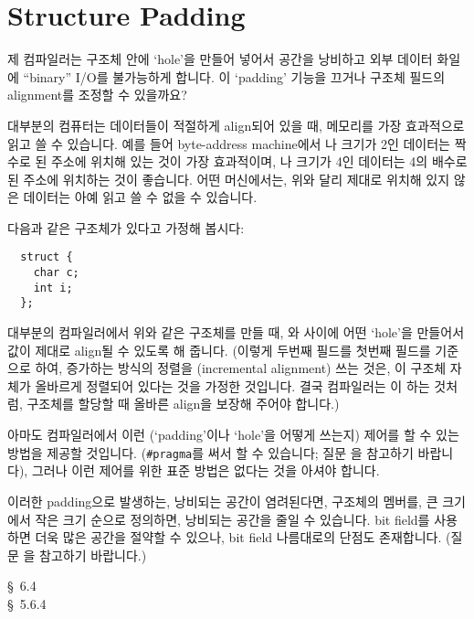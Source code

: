 \section{Structure Padding}

\begin{faq}
	제 컴파일러는 구조체 안에 `hole'을 만들어 넣어서 공간을
	낭비하고 외부 데이터 화일에 ``binary'' I/O를 불가능하게 합니다.
	이 `padding' 기능을 끄거나 구조체 필드의 alignment를 조정할 수
	있을까요?

\A
        대부분의 컴퓨터는 데이터들이 적절하게 align되어 있을 때, 메모리를 가장 효과적으로
        읽고 쓸 수 있습니다. 예를 들어 byte-address machine에서 나
        크기가 2인 데이터는 짝수로 된 주소에 위치해 있는 것이 가장 효과적이며, 
        나 크기가 4인 데이터는 4의 배수로 된 주소에 위치하는 것이
        좋습니다. 어떤 머신에서는, 위와 달리 제대로 위치해 있지 않은 데이터는 아예 읽고
        쓸 수 없을 수 있습니다.

        다음과 같은 구조체가 있다고 가정해 봅시다:
\begin{verbatim}
  struct {
    char c;
    int i;
  };
\end{verbatim}
        대부분의 컴파일러에서 위와 같은 구조체를 만들 때, 와  사이에
        어떤 `hole'을 만들어서  값이 제대로 align될 수 있도록 해 줍니다.
        (이렇게 두번째 필드를 첫번째 필드를 기준으로 하여, 증가하는 방식의 정렬을
        (incremental alignment) 쓰는 것은, 이 구조체 자체가 올바르게 정렬되어 있다는
        것을 가정한 것입니다. 결국 컴파일러는 이 하는 것처럼, 구조체를 할당할 때
        올바른 align을 보장해 주어야 합니다.)

	아마도 컴파일러에서 이런 (`padding'이나 `hole'을 어떻게 쓰는지) 제어를 할 수 있는
        방법을 제공할 것입니다.
	(\verb+#pragma+를 써서 할 수 있습니다; 질문 을 참고하기
	바랍니다), 그러나 이런 제어를 위한 표준 방법은 없다는 것을 아셔야
	합니다.

        이러한 padding으로 발생하는, 낭비되는 공간이 염려된다면, 구조체의 멤버를, 큰 크기에서
        작은 크기 순으로 정의하면, 낭비되는 공간을 줄일 수 있습니다. bit field를 사용하면
        더욱 많은 공간을 절약할 수 있으나, bit field 나름대로의 단점도 존재합니다. (질문
        을 참고하기 바랍니다.)

\R 
	\cite{kr2} \S\ 6.4  \\
	\cite{hs} \S\ 5.6.4 
\end{faq}

